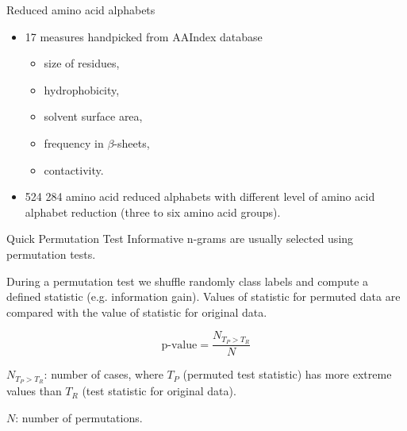 \documentclass{beamer}\usepackage[]{graphicx}\usepackage[]{color}
\begin{document}
  
% 
  
  \begin{frame}{Reduced amino acid alphabets}

\begin{itemize}
\item 17 measures handpicked from AAIndex database 
  \begin{itemize}
    \item size of residues, 
    \item hydrophobicity, 
    \item solvent surface area, 
    \item frequency in $\beta$-sheets,
    \item contactivity.
  \end{itemize}
  \item 524 284 amino acid reduced alphabets with different level of amino acid alphabet reduction (three to six amino acid groups).
  \end{itemize}

    \end{frame}
  
  
% 
  
  \begin{frame}{Quick Permutation Test}
  Informative n-grams are usually selected using permutation tests.

During a permutation test we shuffle randomly class labels and compute a defined statistic (e.g. information gain). Values of statistic for permuted data are compared with the value of statistic for original data.

$$
\textrm{p-value} = \frac{N_{T_P > T_R}}{N} $$

$N_{T_P > T_R}$: number of cases, where $T_P$ (permuted test statistic) has more extreme values than $T_R$ (test statistic for original data).

$N$: number of permutations.
  \end{frame}
  
\end{document}

